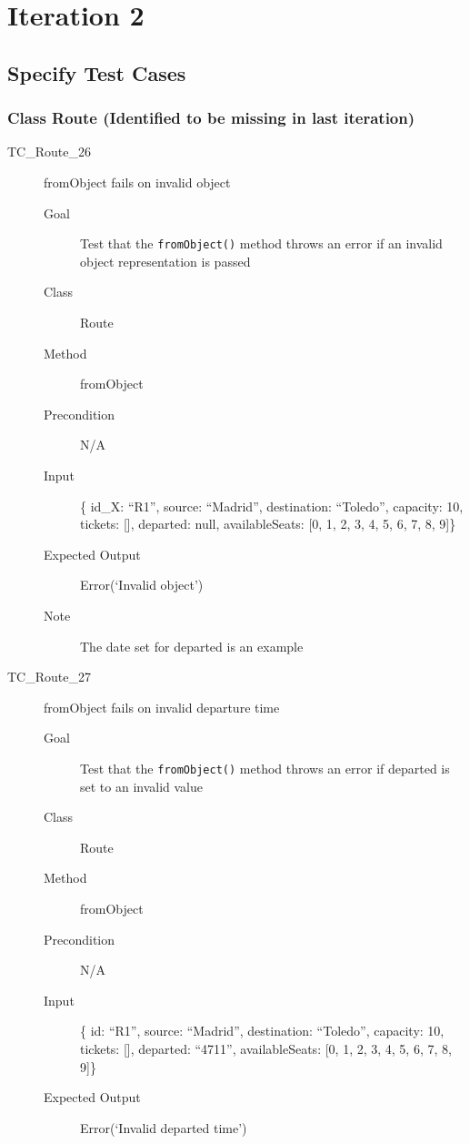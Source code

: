 \documentclass[11pt]{article}
\begin{document}
\section{Iteration 2}
\label{sec:orgf2199f1}

\subsection{Specify Test Cases}
\label{sec:org02d4e8d}

\subsubsection{Class Route (Identified to be missing in last iteration)}
\label{sec:org33b1b0f}

\begin{description}
\item[{TC\_Route\_26}] fromObject fails on invalid object
\begin{description}
\item[{Goal}] Test that the \texttt{fromObject()} method throws an error if an invalid object representation is passed
\item[{Class}] Route
\item[{Method}] fromObject
\item[{Precondition}] N/A
\item[{Input}] \{ id\_X: “R1”, source: “Madrid”, destination: “Toledo”, capacity: 10,  tickets: [], departed: null, availableSeats: [0, 1, 2, 3, 4, 5, 6, 7, 8, 9]\}
\item[{Expected Output}] Error(‘Invalid object’)
\item[{Note}] The date set for departed is an example
\end{description}

\item[{TC\_Route\_27}] fromObject fails on invalid departure time
\begin{description}
\item[{Goal}] Test that the \texttt{fromObject()} method throws an error if departed is set to an invalid value
\item[{Class}] Route
\item[{Method}] fromObject
\item[{Precondition}] N/A
\item[{Input}] \{ id: “R1”, source: “Madrid”, destination: “Toledo”, capacity: 10,  tickets: [], departed: “4711”, availableSeats: [0, 1, 2, 3, 4, 5, 6, 7, 8, 9]\}
\item[{Expected Output}] Error(‘Invalid departed time’)
\end{description}
\end{description}
\end{document}
